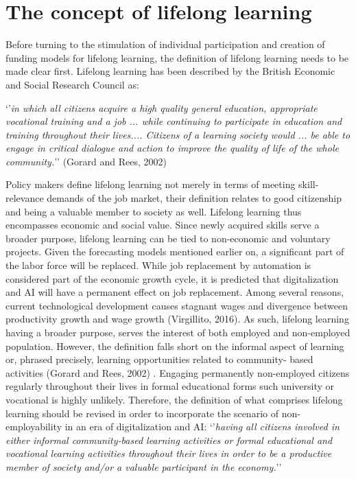 \section*{The concept of lifelong learning}

Before turning to the stimulation of individual participation and creation of funding models for lifelong learning, the definition of lifelong learning needs to be made clear first. Lifelong learning has been described by the British Economic and Social Research Council as: 

‘’\textit{in which all citizens acquire a high quality general education, appropriate vocational training and a job ... while continuing to participate in education and training throughout their lives.... Citizens of a learning society would ... be able to engage in critical dialogue and action to improve the quality of life of the whole community.}’’ (Gorard and Rees, 2002)

Policy makers define lifelong learning not merely in terms of meeting skill-relevance demands of the job market, their definition relates to good citizenship and being a valuable member to society as well. Lifelong learning thus encompasses economic and social value. Since newly acquired skills serve a broader purpose, lifelong learning can be tied to non-economic and voluntary projects. Given the forecasting models mentioned earlier on, a significant part of the labor force will be replaced. While job replacement by automation is considered part of the economic growth cycle, it is predicted that digitalization and AI will have a permanent effect on job replacement. Among several reasons, current technological development causes stagnant wages and divergence between productivity growth and wage growth (Virgillito, 2016). As such, lifelong learning having a broader purpose, serves the interest of both employed and non-employed population. However, the definition falls short on the informal aspect of learning or, phrased precisely, learning opportunities related to community- based activities (Gorard and Rees, 2002) . Engaging permanently non-employed citizens regularly throughout their lives in formal educational forms such university or vocational is highly unlikely. Therefore, the definition of what comprises lifelong learning should be revised in order to incorporate the scenario of non-employability in an era of digitalization and AI:
‘’\textit{having all citizens involved in either informal community-based learning activities or formal educational and vocational learning activities throughout their lives in order to be a productive member of society and/or a valuable participant in the economy.}’’

